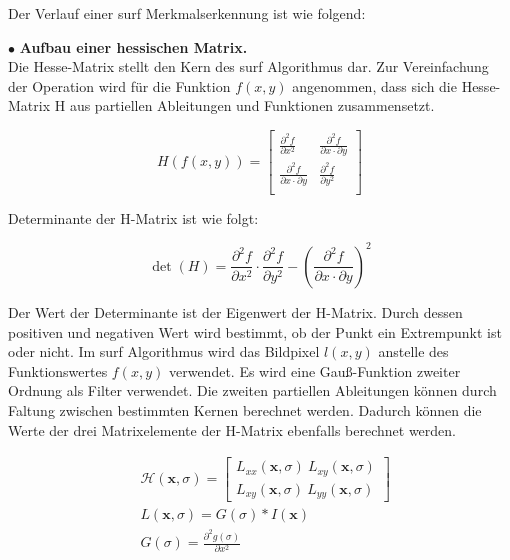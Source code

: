 Der Verlauf einer \gls{surf} Merkmalserkennung ist wie folgend:

$\bullet$ \textbf{Aufbau einer hessischen Matrix.}\\
Die Hesse-Matrix stellt den Kern des \gls{surf} Algorithmus dar. Zur Vereinfachung der Operation wird für die Funktion $f(x,y)$ angenommen, dass sich die Hesse-Matrix H aus partiellen Ableitungen und Funktionen zusammensetzt.

\begin{equation}
   H(f(x,y)) = \begin{bmatrix}
   \frac{\partial^{2}f}{\partial x^{2}} & \frac{\partial^{2}f}{\partial x \cdot \partial y} \\
   \frac{\partial^{2}f}{\partial x \cdot \partial y} & \frac{\partial^{2}f}{\partial y^{2}} \\   
   \end{bmatrix}
\end{equation}

 Determinante der H-Matrix ist wie folgt:
 
\begin{equation}
   \det(H) = \frac{\partial^{2}f}{\partial x^{2}} \cdot \frac{\partial^{2}f}{\partial y^{2}} - (\frac{\partial^{2}f}{\partial x \cdot \partial y})^2  
\end{equation}

Der Wert der Determinante ist der Eigenwert der H-Matrix. Durch dessen positiven und negativen Wert wird bestimmt, ob der Punkt ein Extrempunkt ist oder nicht. Im \gls{surf} Algorithmus wird das Bildpixel $l(x,y)$ anstelle des Funktionswertes $f(x,y)$ verwendet. Es wird eine Gauß-Funktion zweiter Ordnung als Filter verwendet. Die zweiten partiellen Ableitungen können durch Faltung zwischen bestimmten Kernen berechnet werden. Dadurch können die Werte der drei Matrixelemente der H-Matrix ebenfalls berechnet werden.

\begin{equation}
\begin{split}
   &\mathcal{H}(\textbf{x},\sigma) = \begin{bmatrix}
   L_{xx}(\textbf{x},\sigma)\ L_{xy}(\textbf{x},\sigma) \\
   L_{xy}(\textbf{x},\sigma)\ L_{yy}(\textbf{x},\sigma)
   \end{bmatrix} \\   
   &L(\textbf{x},\sigma) = G(\sigma)*I(\textbf{x}) \\  
   &G(\sigma) = \frac{\partial^{2}g(\sigma)}{\partial x^{2}}      
\end{split}
\end{equation}


